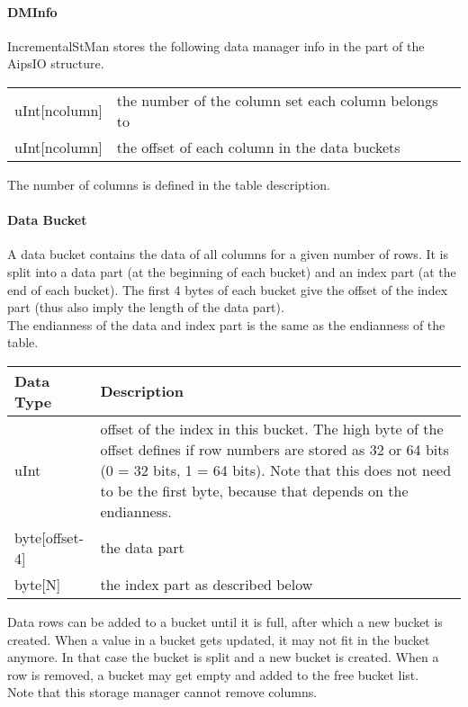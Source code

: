 \paragraph{DMInfo\\}
IncrementalStMan stores the following data manager info in the
 part of the 
 AipsIO structure.

\vspace{0.15in}
\begin{tabular}{|l|p{13cm}|} \hline
  uInt[ncolumn] & the number of the column set each column belongs to \\
  uInt[ncolumn] & the offset of each column in the data buckets \\
  \hline
\end{tabular}
\vspace{0.15in}
The number of columns is defined in the table description.

\paragraph{Data Bucket\\}
A data bucket contains the data of all columns for a given number of
rows. It is split into a data part (at the beginning of each bucket)
and an index part (at the end of each bucket). The first 4 bytes of
each bucket give the offset of the index part (thus also imply the
length of the data part).
\\The endianness of the data and index part is the same as the
endianness of the table. 

\vspace{0.15in}
\begin{tabular}{|l|p{13cm}|} \hline
  Data Type & Description \\ \hline\hline
  uInt & offset of the index in this bucket. The high byte of the
         offset defines if row numbers are stored as 32 or 64 bits
         (0 = 32 bits, 1 = 64 bits). Note that this does not need to
         be the first byte, because that depends on the endianness.\\
  byte[offset-4] & the data part \\
  byte[N] & the index part as described below \\
  \hline
\end{tabular}
\vspace{0.15in}

Data rows can be added to a bucket until it is full, after which a new
bucket is created. When a value in a bucket gets updated, it may not
fit in the bucket anymore. In that case the bucket is split and a new
bucket is created. When a row is removed, a bucket may get empty and
added to the free bucket list.
\\Note that this storage manager cannot remove columns.

